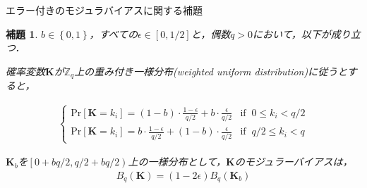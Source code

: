 \documentclass[dvipdfm]{beamer}
\newtheorem{lma}{補題}
\theoremstyle{example}
\begin{document}
\begin{frame}{エラー付きのモジュラバイアスに関する補題}
    \begin{lma}\label{lma_moudlaBias}
        $b\in\left\{0,1\right\}$，すべての$\epsilon\in\left[0,1/2\right]$と，偶数$q>0$において，以下が成り立つ．

        確率変数$\boldsymbol{K}$が$\mathbb{Z}_q$上の重み付き一様分布(weighted uniform distribution)に従うとすると，

        \begin{align*}
            \begin{cases}
                \mathrm{Pr}\left[\boldsymbol{K}=k_i\right]=\left(1-b\right)\cdot \frac{1-\epsilon}{q/2}
                +b\cdot \frac{\epsilon}{q/2}                   & \mathrm{if} \;\; 0 \leq k_i < q/2 \\
                \mathrm{Pr}\left[\boldsymbol{K}=k_i\right]= b \cdot \frac{1-\epsilon}{q/2}
                + \left(1- b \right)\cdot \frac{\epsilon}{q/2} & \mathrm{if} \;\; q/2 \leq k_i < q
            \end{cases}
        \end{align*}

        $\boldsymbol{K}_b$を$\left[0+bq/2,q/2+bq/2\right)$上の一様分布として，$\boldsymbol{K}$のモジュラーバイアスは，
        \begin{align*}
            B_q\left(\boldsymbol{K}\right) = \left(1-2\epsilon\right)B_q\left(\boldsymbol{K}_b\right)
        \end{align*}
    \end{lma}
\end{frame}
\end{document}
